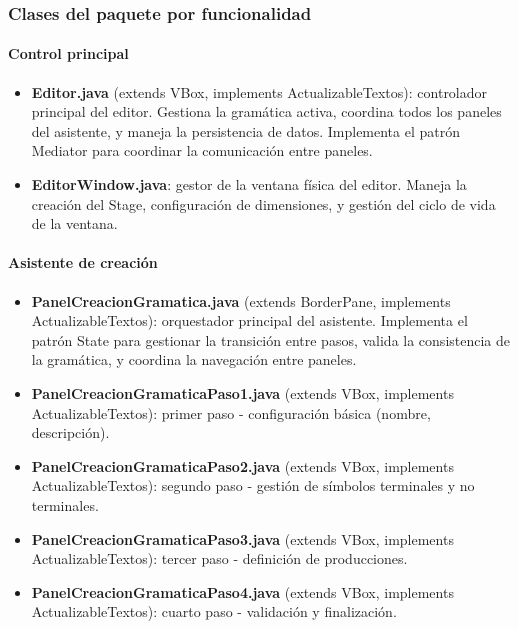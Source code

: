 \subsubsection{Clases del paquete por funcionalidad}

\paragraph{Control principal}
\begin{itemize}
    \item \textbf{Editor.java} (extends VBox, implements ActualizableTextos): controlador principal del editor. Gestiona la gramática activa, coordina todos los paneles del asistente, y maneja la persistencia de datos. Implementa el patrón Mediator para coordinar la comunicación entre paneles.

    \item \textbf{EditorWindow.java}: gestor de la ventana física del editor. Maneja la creación del Stage, configuración de dimensiones, y gestión del ciclo de vida de la ventana.
\end{itemize}

\paragraph{Asistente de creación}
\begin{itemize}
    \item \textbf{PanelCreacionGramatica.java} (extends BorderPane, implements ActualizableTextos): orquestador principal del asistente. Implementa el patrón State para gestionar la transición entre pasos, valida la consistencia de la gramática, y coordina la navegación entre paneles.

    \item \textbf{PanelCreacionGramaticaPaso1.java} (extends VBox, implements ActualizableTextos): primer paso - configuración básica (nombre, descripción).

    \item \textbf{PanelCreacionGramaticaPaso2.java} (extends VBox, implements ActualizableTextos): segundo paso - gestión de símbolos terminales y no terminales.

    \item \textbf{PanelCreacionGramaticaPaso3.java} (extends VBox, implements ActualizableTextos): tercer paso - definición de producciones.

    \item \textbf{PanelCreacionGramaticaPaso4.java} (extends VBox, implements ActualizableTextos): cuarto paso - validación y finalización.
\end{itemize}

